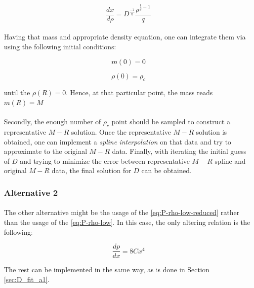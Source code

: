 \documentclass[letterpaper,12pt]{article}
\begin{document}
\begin{equation*}
    \frac{dx}{d \rho} = D^{\frac{-1}{q}} \frac{\rho^{\frac{1}{q} - 1}}{q}
\end{equation*}

\paragraph{} Having that mass and appropriate density equation, one can integrate them via using the following initial conditions:

 \begin{equation*}
     m(0) = 0
 \end{equation*}

 \begin{equation*}
     \rho(0) = \rho_c
 \end{equation*}

 until the $\rho(R) = 0$. Hence, at that particular point, the mass reads $m(R) = M$

 \paragraph{} Secondly, the enough number of $\rho_c$ point should be sampled to construct a representative $M-R$ solution. Once the representative $M-R$ solution is obtained, one can implement a \textit{spline interpolation} on that data and try to approximate to the original $M-R$ data. Finally, with iterating the initial guess of $D$ and trying to minimize the error between representative $M-R$ spline and original $M-R$ data, the final solution for $D$ can be obtained.

 \subsubsection{Alternative 2}
 \label{sec:D_fit_a2}

 \paragraph{} The other alternative might be the usage of the \eqref{eq:P-rho-low-reduced} rather than the usage of the \eqref{eq:P-rho-low}. In this case, the only altering relation is the following:

 \begin{equation*}
    \frac{dp}{dx} = 8Cx^4
 \end{equation*}

 The rest can be implemented in the same way, as is done in Section \ref{sec:D_fit_a1}.
\end{document}
